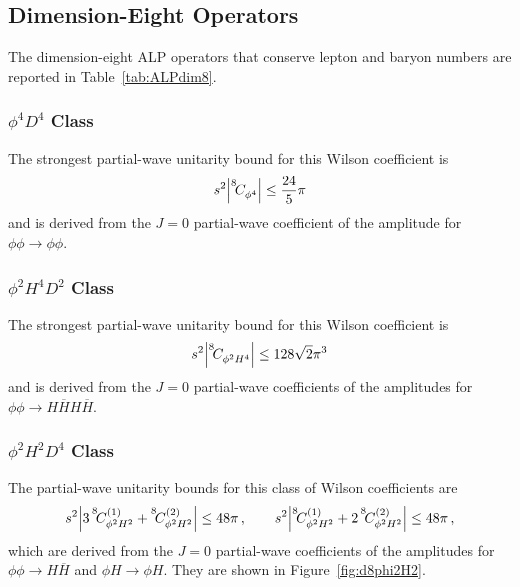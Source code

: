 \subsection{Dimension-Eight Operators}

The dimension-eight ALP operators that conserve lepton and baryon numbers are reported in Table~\ref{tab:ALPdim8}.

\subsubsection{$\phi^4 D^4$ Class\label{par:phi4D4}}
The strongest partial-wave unitarity bound for this Wilson coefficient is
\begin{equation}
    s^2 \abs{\coef{8}{\phi^4}{}} \le \frac{24}{5}\pi
\end{equation}
and is derived from the $J=0$ partial-wave coefficient of the amplitude for $\phi \phi \to \phi \phi$.

\subsubsection{$\phi^2 H^4 D^2$ Class\label{par:phi2H4D2}}
The strongest partial-wave unitarity bound for this Wilson coefficient is
\begin{equation}
    s^2 \abs{\coef{8}{\phi^2 H^4}{}} \le 128\sqrt{2}\pi^3
\end{equation}
and is derived from the $J=0$ partial-wave coefficients of the amplitudes for $\phi \phi \to H\overline HH\overline H$.

\subsubsection{$\phi^2 H^2 D^4$ Class\label{par:phi2H2D4}}
The partial-wave unitarity bounds for this class of Wilson coefficients are
\begin{equation}
    \label{eq:d8-uni_phi2H2}
    s^2 \abs{3\, \coef{8}{\phi^2 H^2}{(1)}+\coef{8}{\phi^2 H^2}{(2)}} \le 48 \pi\,, 
    \qquad 
    s^2  \abs{\coef{8}{\phi^2 H^2}{(1)}+2\, \coef{8}{\phi^2 H^2}{(2)}} \le 48 \pi\,,
\end{equation}
which are derived from the $J=0$ partial-wave coefficients of the amplitudes for $\phi \phi \to H\overline H$ and $\phi H \to \phi H$.
They are shown in Figure~\ref{fig:d8phi2H2}.

